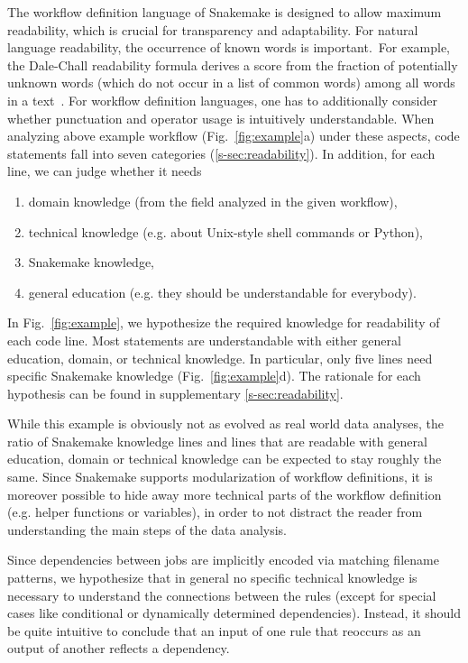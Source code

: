 \documentclass[parskip=half]{scrartcl}
\begin{document}
The workflow definition language of Snakemake is designed to allow maximum readability, which is crucial for transparency and adaptability.
For natural language readability, the occurrence of known words is important.~For example, the Dale-Chall readability formula derives a score from the fraction of potentially unknown words (which do not occur in a list of common words) among all words in a text~\parencite{chall_readability_1995}.
For workflow definition languages, one has to additionally consider whether punctuation and operator usage is intuitively understandable.
When analyzing above example workflow (Fig.~\ref{fig:example}a) under these aspects, code statements fall into seven categories (\autoref{s-sec:readability}).
In addition, for each line, we can judge whether it needs 

\begin{enumerate}
	\item domain knowledge (from the field analyzed in the given workflow),
	\item technical knowledge (e.g. about Unix-style shell commands or Python),
	\item Snakemake knowledge,
	\item general education (e.g. they should be understandable for everybody).
\end{enumerate}

In Fig.~{\ref{fig:example}}, we hypothesize the required knowledge for readability of each code line.
Most statements are understandable with either general education, domain, or technical knowledge.
In particular, only five lines need specific Snakemake knowledge (Fig.~{\ref{fig:example}}d).
The rationale for each hypothesis can be found in supplementary \autoref{s-sec:readability}.

While this example is obviously not as evolved as real world data analyses, the ratio of Snakemake knowledge lines and lines that are readable with general education, domain or technical knowledge can be expected to stay roughly the same.
Since Snakemake supports modularization of workflow definitions, it is moreover possible to hide away more technical parts of the workflow definition (e.g. helper functions or variables), in order to not distract the reader from understanding the main steps of the data analysis.

Since dependencies between jobs are implicitly encoded via matching filename patterns, we hypothesize that in general no specific technical knowledge is necessary to understand the connections between the rules (except for special cases like conditional or dynamically determined dependencies).
Instead, it should be quite intuitive to conclude that an input of one rule that reoccurs as an output of another reflects a dependency.
\end{document}
